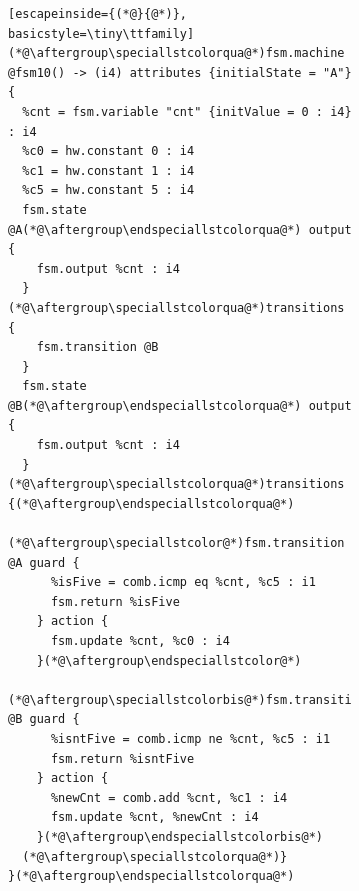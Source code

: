 \documentclass[acmsmall,screen,review]{acmart}
\begin{document}
\def\speciallstcolor{\begingroup\color{col1}}
\def\endspeciallstcolor{\endgroup}

\def\speciallstcolorbis{\begingroup\color{col2}}
\def\endspeciallstcolorbis{\endgroup}

\def\speciallstcolorter{\begingroup\color{col3}}
\def\endspeciallstcolorter{\endgroup}

\def\speciallstcolorqua{\begingroup\color{col4}}
\def\endspeciallstcolorqua{\endgroup}
\begin{figure}[h]
  
  \begin{subfigure}[T]{0.6\columnwidth}
\begin{lstlisting}[escapeinside={(*@}{@*)}, basicstyle=\tiny\ttfamily]
(*@\aftergroup\speciallstcolorqua@*)fsm.machine @fsm10() -> (i4) attributes {initialState = "A"} {
  %cnt = fsm.variable "cnt" {initValue = 0 : i4} : i4
  %c0 = hw.constant 0 : i4
  %c1 = hw.constant 1 : i4
  %c5 = hw.constant 5 : i4
  fsm.state @A(*@\aftergroup\endspeciallstcolorqua@*) output {
    fsm.output %cnt : i4
  } (*@\aftergroup\speciallstcolorqua@*)transitions { 
    fsm.transition @B
  }
  fsm.state @B(*@\aftergroup\endspeciallstcolorqua@*) output {
    fsm.output %cnt : i4
  } (*@\aftergroup\speciallstcolorqua@*)transitions {(*@\aftergroup\endspeciallstcolorqua@*)
    (*@\aftergroup\speciallstcolor@*)fsm.transition @A guard {
      %isFive = comb.icmp eq %cnt, %c5 : i1
      fsm.return %isFive
    } action {
      fsm.update %cnt, %c0 : i4
    }(*@\aftergroup\endspeciallstcolor@*)
    (*@\aftergroup\speciallstcolorbis@*)fsm.transition @B guard {
      %isntFive = comb.icmp ne %cnt, %c5 : i1
      fsm.return %isntFive
    } action {
      %newCnt = comb.add %cnt, %c1 : i4
      fsm.update %cnt, %newCnt : i4
    }(*@\aftergroup\endspeciallstcolorbis@*)
  (*@\aftergroup\speciallstcolorqua@*)}
}(*@\aftergroup\endspeciallstcolorqua@*)
\end{lstlisting}
  \end{subfigure}
  \begin{subfigure}[T]{0.39\columnwidth}

\end{subfigure}
\end{figure}
\end{document}
